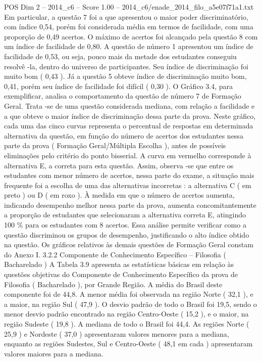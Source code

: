 \begin{textsample}{POS Dim 2 – 2014\_c6 – Score 1.00 – 2014\_c6/enade\_2014\_filo\_a5e07f71a1.txt}
Em particular, a questão 7 foi a que apresentou o maior poder discriminatório, com índice 0,54, porém foi considerada média em termos de facilidade, com uma proporção de 0,49 acertos.
O máximo de acertos foi alcançado pela questão 8 com um índice de facilidade de 0,80.
A questão de número 1 apresentou um índice de facilidade de 0,53, ou seja, pouco mais da metade dos estudantes conseguiu resolvê -la, dentro do universo de participantes.
Seu índice de discriminação foi muito bom ( 0,43 ).
Já a questão 5 obteve índice de discriminação muito bom, 0,41, porém seu índice de facilidade foi difícil ( 0,30 ).
O Gráfico 3.4, para exemplificar, analisa o comportamento da questão de número 7 de Formação Geral.
Trata -se de uma questão considerada mediana, com relação a facilidade e a que obteve o maior índice de discriminação dessa parte da prova.
Neste gráfico, cada uma das cinco curvas representa o percentual de respostas em determinada alternativa da questão, em função do número de acertos dos estudantes nessa parte da prova ( Formação Geral/Múltipla Escolha ), antes de possíveis eliminações pelo critério do ponto bisserial.
A curva em vermelho corresponde à alternativa E, a correta para esta questão.
Assim, observa -se que entre os estudantes com menor número de acertos, nessa parte do exame, a situação mais frequente foi a escolha de uma das alternativas incorretas : a alternativa C ( em preto ) ou D ( em roxo ).
À medida em que o número de acertos aumenta, indicando desempenho melhor nessa parte da prova, aumenta concomitantemente a proporção de estudantes que selecionaram a alternativa correta E, atingindo 100 \% para os estudantes com 8 acertos.
Essa análise permite verificar como a questão discriminou os grupos de desempenho, justificando o alto índice obtido na questão.
Os gráficos relativos às demais questões de Formação Geral constam do Anexo I. 3.2.2 Componente de Conhecimento Específico – Filosofia ( Bacharelado ) A Tabela 3.9 apresenta as estatísticas básicas em relação às questões objetivas do Componente de Conhecimento Específico da prova de Filosofia ( Bacharelado ), por Grande Região.
A média do Brasil deste componente foi de 44,8.
A menor média foi observada na região Norte ( 32,1 ), e a maior, na região Sul ( 47,9 ).
O desvio padrão de todo o Brasil foi 19,5, sendo o menor desvio padrão encontrado na região Centro-Oeste ( 15,2 ), e o maior, na região Sudeste ( 19,8 ).
A mediana de todo o Brasil foi 44,4.
As regiões Norte ( 25,9 ) e Nordeste ( 37,0 ) apresentaram valores menores para a mediana, enquanto as regiões Sudestes, Sul e Centro-Oeste ( 48,1 em cada ) apresentaram valores maiores para a mediana.

\end{textsample}
